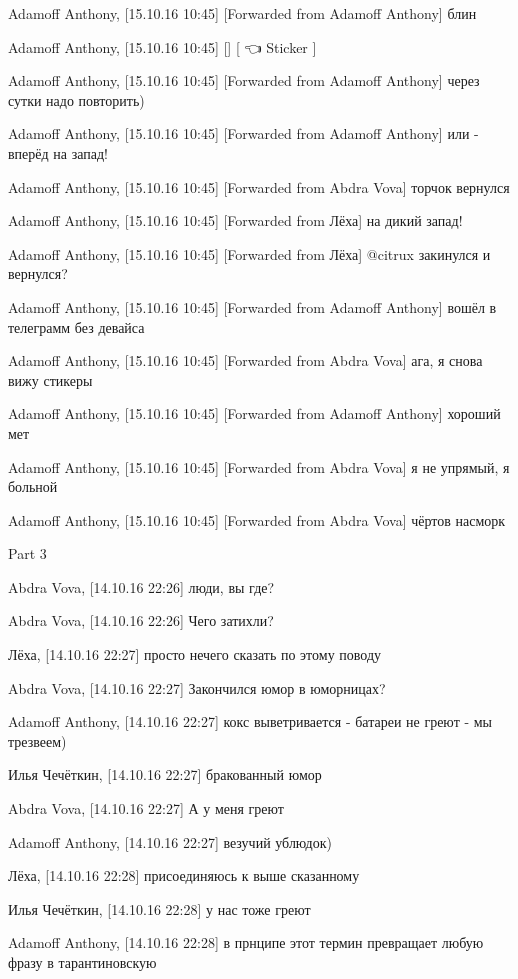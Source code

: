Adamoff Anthony, [15.10.16 10:45]
[Forwarded from Adamoff Anthony]
блин

Adamoff Anthony, [15.10.16 10:45]
[]
[ 👈 Sticker ]

Adamoff Anthony, [15.10.16 10:45]
[Forwarded from Adamoff Anthony]
через сутки надо повторить)

Adamoff Anthony, [15.10.16 10:45]
[Forwarded from Adamoff Anthony]
или - вперёд на запад!

Adamoff Anthony, [15.10.16 10:45]
[Forwarded from Abdra Vova]
торчок вернулся

Adamoff Anthony, [15.10.16 10:45]
[Forwarded from Лёха]
на дикий запад!

Adamoff Anthony, [15.10.16 10:45]
[Forwarded from Лёха]
@citrux закинулся и вернулся?

Adamoff Anthony, [15.10.16 10:45]
[Forwarded from Adamoff Anthony]
вошёл в телеграмм без девайса

Adamoff Anthony, [15.10.16 10:45]
[Forwarded from Abdra Vova]
ага, я снова вижу стикеры

Adamoff Anthony, [15.10.16 10:45]
[Forwarded from Adamoff Anthony]
хороший мет

Adamoff Anthony, [15.10.16 10:45]
[Forwarded from Abdra Vova]
я не упрямый, я больной

Adamoff Anthony, [15.10.16 10:45]
[Forwarded from Abdra Vova]
чёртов насморк


\begin{center}
\large Part 3
\end{center}


Abdra Vova, [14.10.16 22:26]
люди, вы где?

Abdra Vova, [14.10.16 22:26]
Чего затихли?

Лёха, [14.10.16 22:27]
просто нечего сказать по этому поводу

Abdra Vova, [14.10.16 22:27]
Закончился юмор в юморницах?

Adamoff Anthony, [14.10.16 22:27]
кокс выветривается - батареи не греют - мы трезвеем)

Илья Чечёткин, [14.10.16 22:27]
бракованный юмор

Abdra Vova, [14.10.16 22:27]
А у меня греют

Adamoff Anthony, [14.10.16 22:27]
везучий ублюдок)

Лёха, [14.10.16 22:28]
присоединяюсь к выше сказанному

Илья Чечёткин, [14.10.16 22:28]
у нас тоже греют

Adamoff Anthony, [14.10.16 22:28]
в прнципе этот термин превращает любую фразу в тарантиновскую

